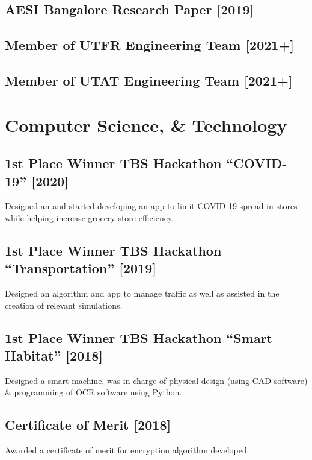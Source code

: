 \documentclass[%
               doublesided,
               paper=a4,
               fontsize=10pt
              ]{my-resume}
\begin{document}
{        \subsection{AESI Bangalore Research Paper [2019]}
        
        \subsection{Member of UTFR Engineering Team [2021+]}
        
        \subsection{Member of UTAT Engineering Team [2021+]}

    \section{Computer Science, \& Technology}
        \subsection{1st Place Winner TBS Hackathon ``COVID-19'' [2020]}
            Designed an and started developing an app to limit COVID-19 spread in stores while helping increase grocery store efficiency.
            
        \subsection{1st Place Winner TBS Hackathon ``Transportation'' [2019]}
             Designed an algorithm and app to manage traffic as well as assisted in the creation of relevant simulations.
             
        \subsection{1st Place Winner TBS Hackathon ``Smart Habitat'' [2018]}
            Designed a smart machine, was in charge of physical design (using CAD software) & programming of OCR software using Python.
            
        \subsection{Certificate of Merit [2018]}
            Awarded a certificate of merit for encryption algorithm developed.
            
}
\end{document}
